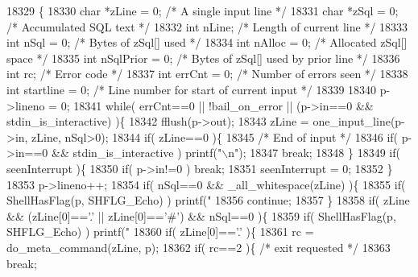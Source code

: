 \begin{DoxyCode}
18329                                        \{
18330   \textcolor{keywordtype}{char} *zLine = 0;          \textcolor{comment}{/* A single input line */}
18331   \textcolor{keywordtype}{char} *zSql = 0;           \textcolor{comment}{/* Accumulated SQL text */}
18332   \textcolor{keywordtype}{int} nLine;                \textcolor{comment}{/* Length of current line */}
18333   \textcolor{keywordtype}{int} nSql = 0;             \textcolor{comment}{/* Bytes of zSql[] used */}
18334   \textcolor{keywordtype}{int} nAlloc = 0;           \textcolor{comment}{/* Allocated zSql[] space */}
18335   \textcolor{keywordtype}{int} nSqlPrior = 0;        \textcolor{comment}{/* Bytes of zSql[] used by prior line */}
18336   \textcolor{keywordtype}{int} rc;                   \textcolor{comment}{/* Error code */}
18337   \textcolor{keywordtype}{int} errCnt = 0;           \textcolor{comment}{/* Number of errors seen */}
18338   \textcolor{keywordtype}{int} startline = 0;        \textcolor{comment}{/* Line number for start of current input */}
18339 
18340   p->lineno = 0;
18341   \textcolor{keywordflow}{while}( errCnt==0 || !bail_on_error || (p->in==0 && stdin_is_interactive) )\{
18342     fflush(p->out);
18343     zLine = one_input_line(p->in, zLine, nSql>0);
18344     \textcolor{keywordflow}{if}( zLine==0 )\{
18345       \textcolor{comment}{/* End of input */}
18346       \textcolor{keywordflow}{if}( p->in==0 && stdin_is_interactive ) printf(\textcolor{stringliteral}{"\(\backslash\)n"});
18347       \textcolor{keywordflow}{break};
18348     \}
18349     \textcolor{keywordflow}{if}( seenInterrupt )\{
18350       \textcolor{keywordflow}{if}( p->in!=0 ) \textcolor{keywordflow}{break};
18351       seenInterrupt = 0;
18352     \}
18353     p->lineno++;
18354     \textcolor{keywordflow}{if}( nSql==0 && _all_whitespace(zLine) )\{
18355       \textcolor{keywordflow}{if}( ShellHasFlag(p, SHFLG_Echo) ) printf(\textcolor{stringliteral}{"%
18356       \textcolor{keywordflow}{continue};
18357     \}
18358     \textcolor{keywordflow}{if}( zLine && (zLine[0]==\textcolor{charliteral}{'.'} || zLine[0]==\textcolor{charliteral}{'#'}) && nSql==0 )\{
18359       \textcolor{keywordflow}{if}( ShellHasFlag(p, SHFLG_Echo) ) printf(\textcolor{stringliteral}{"%
18360       \textcolor{keywordflow}{if}( zLine[0]==\textcolor{charliteral}{'.'} )\{
18361         rc = do_meta_command(zLine, p);
18362         \textcolor{keywordflow}{if}( rc==2 )\{ \textcolor{comment}{/* exit requested */}
18363           \textcolor{keywordflow}{break};
}}
\end{DoxyCode}
